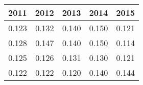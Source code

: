 \begin{tabular}{rrrrr}
\toprule
2011 & 2012 & 2013 & 2014 & 2015 \\
\midrule
0.123 & 0.132 & 0.140 & 0.150 & 0.121 \\
0.128 & 0.147 & 0.140 & 0.150 & 0.114 \\
0.125 & 0.126 & 0.131 & 0.130 & 0.121 \\
0.122 & 0.122 & 0.120 & 0.140 & 0.144 \\
\bottomrule
\end{tabular}
